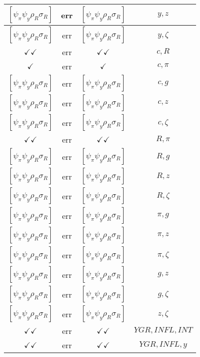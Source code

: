 \documentclass[a4paper,10pt]{article}
\begin{document}
\begin{longtable}{|c|c|c|c|}
\hline
$[\psi_\pi \psi_y \rho_R \sigma_R ]$ & err & $[\psi_\pi \psi_y \rho_R \sigma_R ]$ & ${y},{z}$ \\
\hline
$[\psi_\pi \psi_y \rho_R \sigma_R ]$ & err & $[\psi_\pi \psi_y \rho_R \sigma_R ]$ & ${y},{\zeta}$ \\
\hline
$\checkmark\checkmark$ & err & $\checkmark\checkmark$ & ${c},{R}$ \\
\hline
$\checkmark$ & err & $\checkmark$ & ${c},{\pi}$ \\
\hline
$[\psi_\pi \psi_y \rho_R \sigma_R ]$ & err & $[\psi_\pi \psi_y \rho_R \sigma_R ]$ & ${c},{g}$ \\
\hline
$[\psi_\pi \psi_y \rho_R \sigma_R ]$ & err & $[\psi_\pi \psi_y \rho_R \sigma_R ]$ & ${c},{z}$ \\
\hline
$[\psi_\pi \psi_y \rho_R \sigma_R ]$ & err & $[\psi_\pi \psi_y \rho_R \sigma_R ]$ & ${c},{\zeta}$ \\
\hline
$\checkmark\checkmark$ & err & $\checkmark\checkmark$ & ${R},{\pi}$ \\
\hline
$[\psi_\pi \psi_y \rho_R \sigma_R ]$ & err & $[\psi_\pi \psi_y \rho_R \sigma_R ]$ & ${R},{g}$ \\
\hline
$[\psi_\pi \psi_y \rho_R \sigma_R ]$ & err & $[\psi_\pi \psi_y \rho_R \sigma_R ]$ & ${R},{z}$ \\
\hline
$[\psi_\pi \psi_y \rho_R \sigma_R ]$ & err & $[\psi_\pi \psi_y \rho_R \sigma_R ]$ & ${R},{\zeta}$ \\
\hline
$[\psi_\pi \psi_y \rho_R \sigma_R ]$ & err & $[\psi_\pi \psi_y \rho_R \sigma_R ]$ & ${\pi},{g}$ \\
\hline
$[\psi_\pi \psi_y \rho_R \sigma_R ]$ & err & $[\psi_\pi \psi_y \rho_R \sigma_R ]$ & ${\pi},{z}$ \\
\hline
$[\psi_\pi \psi_y \rho_R \sigma_R ]$ & err & $[\psi_\pi \psi_y \rho_R \sigma_R ]$ & ${\pi},{\zeta}$ \\
\hline
$[\psi_\pi \psi_y \rho_R \sigma_R ]$ & err & $[\psi_\pi \psi_y \rho_R \sigma_R ]$ & ${g},{z}$ \\
\hline
$[\psi_\pi \psi_y \rho_R \sigma_R ]$ & err & $[\psi_\pi \psi_y \rho_R \sigma_R ]$ & ${g},{\zeta}$ \\
\hline
$[\psi_\pi \psi_y \rho_R \sigma_R ]$ & err & $[\psi_\pi \psi_y \rho_R \sigma_R ]$ & ${z},{\zeta}$ \\
\hline
$\checkmark\checkmark$ & err & $\checkmark\checkmark$ & ${YGR},{INFL},{INT}$ \\
\hline
$\checkmark\checkmark$ & err & $\checkmark\checkmark$ & ${YGR},{INFL},{y}$ \\

\end{longtable}
\end{document}
